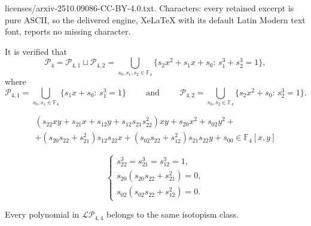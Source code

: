 \documentclass[10pt,a4paper]{amsart}
\begin{document}
licenses/arxiv-2510.09086-CC-BY-4.0.txt. Characters: every retained excerpt is pure ASCII, so the delivered engine, XeLaTeX with its default Latin Modern text font, reports no missing character.
\begin{proposition}\label{proposition_P4} It is verified that
\[\mathcal{P}_4=\mathcal{P}_{4,1}\sqcup \mathcal{P}_{4,2}=\bigcup_{s_0,s_1,s_2\in\mathbb{F}_4}\{s_2x^2+s_1x+s_0\colon\,s_1^3+s_2^3=1\},\]
where
\[\mathcal{P}_{4,1}=\bigcup_{s_0,s_1\in\mathbb{F}_4}\{s_1x+s_0\colon\, s_1^3=1\} \hspace{1cm}\text{and}\hspace{1cm}
\mathcal{P}_{4,2}=\bigcup_{s_0,s_2\in\mathbb{F}_4}\{s_2x^2+s_0\colon\, s_2^3=1\}.\]
\end{proposition}

\begin{equation}\label{eq_LP4}
\begin{split}
\left(s_{22}xy+s_{21}x+s_{12}y+s_{12}s_{21}s_{22}^2\right)xy+s_{20}x^2+s_{02}y^2+\\ +(s_{20}s_{22}+s_{21}^2)s_{12}s_{22}x+(s_{02}s_{22}+s_{12}^2)s_{21}s_{22}y+s_{00}\in\mathbb{F}_4[x,y]    
\end{split}
\end{equation}

\begin{equation}\label{eq_LP4_constraints}
\begin{cases}
s_{22}^3=s_{21}^3=s_{12}^3=1,\\
s_{20}(s_{20}s_{22}+s_{21}^2)=0,\\
s_{02}(s_{02}s_{22}+s_{12}^2)=0.
\end{cases}
\end{equation}

\begin{theorem}\label{theorem_S2} Every polynomial in $\mathcal{LP}_{4,4}$ belongs to the same isotopism class.
\end{theorem}
\end{document}
